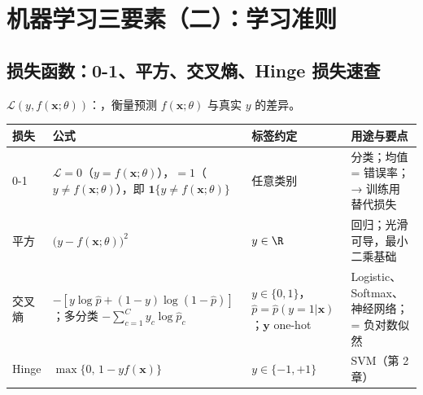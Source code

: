 \section{机器学习三要素（二）：学习准则}

\subsection{损失函数：0-1、平方、交叉熵、Hinge 损失速查}
 $\mathcal L(y,f(\bm x;\theta))$：，衡量预测 $f(\bm x;\theta)$ 与真实 $y$ 的差异。
\begin{center}\small
\begin{tabularx}{\linewidth}{@{}p{1.7cm}>{\raggedright\arraybackslash}p{5.4cm}>{\raggedright\arraybackslash}p{2.5cm}L@{}}
\toprule
损失 & 公式 & 标签约定 & 用途与要点 \\
-1 & $\mathcal L=0$（$y=f(\bm x;\theta)$），$=1$（$y\neq f(\bm x;\theta)$），即 $\mathbf 1\{y\neq f(\bm x;\theta)\}$ & 任意类别 & 分类；均值 = 错误率； → 训练用替代损失 \\
平方 & $\big(y-f(\bm x;\theta)\big)^2$ & $y\in\R$ & 回归；光滑可导，最小二乘基础 \\
交叉熵 & $-[y\log\hat p+(1-y)\log(1-\hat p)]$；多分类 $-\sum_{c=1}^Cy_c\log\hat p_c$ & $y\in\{0,1\}$，$\hat p=\hat p(y{=}1|\bm x)$；$\bm y$ one-hot & Logistic、Softmax、神经网络；= 负对数似然 \\
Hinge & $\max\{0,\,1-yf(\bm x)\}$ & $y\in\{-1,+1\}$ & SVM（第 2 章）\\
\bottomrule
\end{tabularx}
\end{center}

